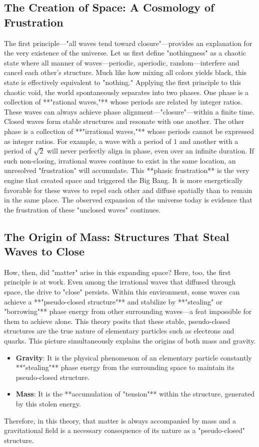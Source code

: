 \documentclass[11pt,a4paper]{article}
\begin{document}
\subsection{The Creation of Space: A Cosmology of Frustration}
The first principle—"all waves tend toward closure"—provides an explanation for the very existence of the universe. Let us first define "nothingness" as a chaotic state where all manner of waves—periodic, aperiodic, random—interfere and cancel each other's structure. Much like how mixing all colors yields black, this state is effectively equivalent to "nothing."
Applying the first principle to this chaotic void, the world spontaneously separates into two phases.
One phase is a collection of **"rational waves,"** whose periods are related by integer ratios. These waves can always achieve phase alignment—"closure"—within a finite time. Closed waves form stable structures and resonate with one another.
The other phase is a collection of **"irrational waves,"** whose periods cannot be expressed as integer ratios. For example, a wave with a period of 1 and another with a period of $\sqrt{2}$ will never perfectly align in phase, even over an infinite duration. If such non-closing, irrational waves continue to exist in the same location, an unresolved "frustration" will accumulate.
This **phasic frustration** is the very engine that created space and triggered the Big Bang. It is more energetically favorable for these waves to repel each other and diffuse spatially than to remain in the same place. The observed expansion of the universe today is evidence that the frustration of these "unclosed waves" continues.
\subsection{The Origin of Mass: Structures That Steal Waves to Close}
How, then, did "matter" arise in this expanding space? Here, too, the first principle is at work.
Even among the irrational waves that diffused through space, the drive to "close" persists. Within this environment, some waves can achieve a **"pseudo-closed structure"** and stabilize by **"stealing" or "borrowing"** phase energy from other surrounding waves—a feat impossible for them to achieve alone.
This theory posits that these stable, pseudo-closed structures are the true nature of elementary particles such as electrons and quarks.
This picture simultaneously explains the origins of both mass and gravity.
\begin{itemize}
    \item \textbf{Gravity}: It is the physical phenomenon of an elementary particle constantly **"stealing"** phase energy from the surrounding space to maintain its pseudo-closed structure.
    \item \textbf{Mass}: It is the **accumulation of "tension"** within the structure, generated by this stolen energy.
\end{itemize}
Therefore, in this theory, that matter is always accompanied by mass and a gravitational field is a necessary consequence of its nature as a "pseudo-closed" structure.
\end{document}
